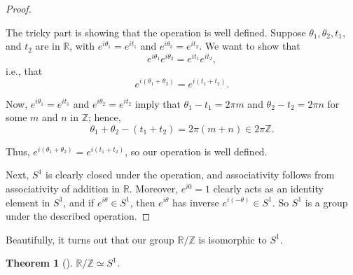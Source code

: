 \documentclass[10pt,]{book}
\theoremstyle{plain}
\newtheorem{theorem}{Theorem}[section]
\theoremstyle{definition}
\theoremstyle{definition}
\theoremstyle{definition}
\theoremstyle{definition}
\numberwithin{equation}{section}
\def\Z{\mathbb{Z}}
\def\R{\mathbb{R}}
\begin{document}
\begin{proof}\hypertarget{proof-53}{}
The tricky part is showing that the operation is well defined. Suppose \(\theta_1, \theta_2, t_1\), and \(t_2\) are in \(\R\), with \(e^{i\theta_1}=e^{it_1}\) and \(e^{i\theta_2}=e^{it_2}\). We want to show that%
\begin{equation*}
e^{i\theta_1}e^{i\theta_2}=e^{it_1}e^{it_2},
\end{equation*}
i.e., that%
\begin{equation*}
e^{i(\theta_1+\theta_2)}=e^{i(t_1+t_2)}.
\end{equation*}
%
\par
Now, \(e^{i\theta_1}=e^{it_1}\) and \(e^{i\theta_2}=e^{it_2}\) imply that \(\theta_1 -t_1 = 2\pi m\) and \(\theta_2-t_2 = 2\pi n\) for some \(m\) and \(n\) in \(\Z\); hence,%
\begin{equation*}
\theta_1+\theta_2-(t_1+t_2)= 2\pi(m+n) \in 2\pi\Z.
\end{equation*}
%
\par
Thus, \(e^{i(\theta_1+\theta_2)}=e^{i(t_1+t_2)}\), so our operation is well defined.%
\par
Next, \(S^1\) is clearly closed under the operation, and associativity follows from associativity of addition in \(\R\). Moreover, \(e^{i0}=1\) clearly acts as an identity element in \(S^1\), and if \(e^{i\theta}\in S^1\), then \(e^{i\theta}\) has inverse \(e^{i(-\theta)} \in S^1\). So \(S^1\) is a group under the described operation.%
\end{proof}
Beautifully, it turns out that our group \(\R/\Z\) is isomorphic to \(S^1\).%
\begin{theorem}[{}]\label{theorem-66}
\(\R/\Z \simeq S^1\).%
\end{theorem}
\end{document}
